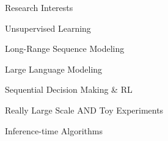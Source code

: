         \begin{xSection}{Research Interests}

            \medskip
            \small
            \begin{myitemize}
                \item Unsupervised Learning
                \item Long-Range Sequence Modeling
                \item Large Language Modeling
                \item Sequential Decision Making \& RL
                \item Really Large Scale AND Toy Experiments
                \item Inference-time Algorithms
            \end{myitemize}

        \end{xSection}

        \medskip

